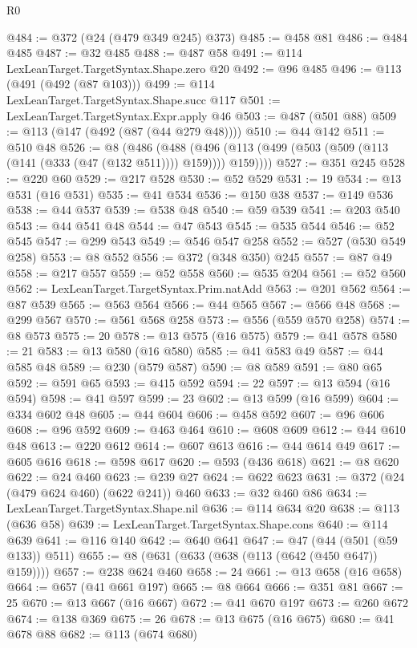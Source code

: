 \begin{lexlean}{R0}
\begin{coremodule}
{{{{{{{{{{{{{{{{{{{{{{{{{{{{{{{{{{{{{{{{{{{{{{{{{{{{{{{{{{{{{{{{{{{{{{{{{@484 := @372 (@24 (@479 @349 @245) @373)
@485 := @458 @81
@486 := @484 @485
@487 := @32 @485
@488 := @487 @58
@491 := @114 LexLeanTarget.TargetSyntax.Shape.zero @20
@492 := @96 @485
@496 := @113 (@491 (@492 (@87 @103)))
@499 := @114 LexLeanTarget.TargetSyntax.Shape.succ @117
@501 := LexLeanTarget.TargetSyntax.Expr.apply @46
@503 := @487 (@501 @88)
@509 := @113 (@147 (@492 (@87 (@44 @279 @48))))
@510 := @44 @142
@511 := @510 @48
@526 := @8
    (@486
      (@488 (@496 (@113 (@499 (@503 (@509 (@113 (@141 (@333 (@47 (@132 @511)))) @159)))) @159))))
@527 := @351 @245
@528 := @220 @60
@529 := @217 @528
@530 := @52 @529
@531 := 19
@534 := @13 @531 (@16 @531)
@535 := @41 @534
@536 := @150 @38
@537 := @149 @536
@538 := @44 @537
@539 := @538 @48
@540 := @59 @539
@541 := @203 @540
@543 := @44 @541 @48
@544 := @47 @543
@545 := @535 @544
@546 := @52 @545
@547 := @299 @543
@549 := @546 @547 @258
@552 := @527 (@530 @549 @258)
@553 := @8 @552
@556 := @372 (@348 @350) @245
@557 := @87 @49
@558 := @217 @557
@559 := @52 @558
@560 := @535 @204
@561 := @52 @560
@562 := LexLeanTarget.TargetSyntax.Prim.natAdd
@563 := @201 @562
@564 := @87 @539
@565 := @563 @564
@566 := @44 @565
@567 := @566 @48
@568 := @299 @567
@570 := @561 @568 @258
@573 := @556 (@559 @570 @258)
@574 := @8 @573
@575 := 20
@578 := @13 @575 (@16 @575)
@579 := @41 @578
@580 := 21
@583 := @13 @580 (@16 @580)
@585 := @41 @583 @49
@587 := @44 @585 @48
@589 := @230 (@579 @587)
@590 := @8 @589
@591 := @80 @65
@592 := @591 @65
@593 := @415 @592
@594 := 22
@597 := @13 @594 (@16 @594)
@598 := @41 @597
@599 := 23
@602 := @13 @599 (@16 @599)
@604 := @334 @602 @48
@605 := @44 @604
@606 := @458 @592
@607 := @96 @606
@608 := @96 @592
@609 := @463 @464
@610 := @608 @609
@612 := @44 @610 @48
@613 := @220 @612
@614 := @607 @613
@616 := @44 @614 @49
@617 := @605 @616
@618 := @598 @617
@620 := @593 (@436 @618)
@621 := @8 @620
@622 := @24 @460
@623 := @239 @27
@624 := @622 @623
@631 := @372 (@24 (@479 @624 @460) (@622 @241)) @460
@633 := @32 @460 @86
@634 := LexLeanTarget.TargetSyntax.Shape.nil
@636 := @114 @634 @20
@638 := @113 (@636 @58)
@639 := LexLeanTarget.TargetSyntax.Shape.cons
@640 := @114 @639
@641 := @116 @140
@642 := @640 @641
@647 := @47 (@44 (@501 (@59 @133)) @511)
@655 := @8 (@631 (@633 (@638 (@113 (@642 (@450 @647)) @159))))
@657 := @238 @624 @460
@658 := 24
@661 := @13 @658 (@16 @658)
@664 := @657 (@41 @661 @197)
@665 := @8 @664
@666 := @351 @81
@667 := 25
@670 := @13 @667 (@16 @667)
@672 := @41 @670 @197
@673 := @260 @672
@674 := @138 @369
@675 := 26
@678 := @13 @675 (@16 @675)
@680 := @41 @678 @88
@682 := @113 (@674 @680)
}}}}}}}}}}}}}}}}}}}}}}}}}}}}}}}}}}}}}}}}}}}}}}}}}}}}}}}}}}}}}}}}}}}}}}}}}
\end{coremodule}
\end{lexlean}
